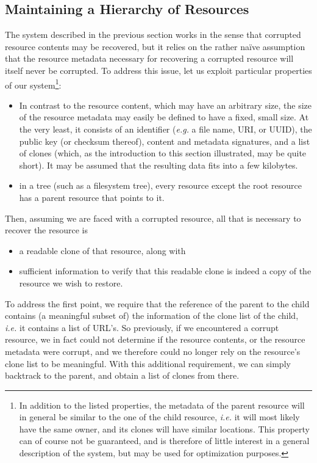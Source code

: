 \documentclass[11pt]{article}
\begin{document}
\begin{mainmatter}
\subsection{Maintaining a Hierarchy of Resources}
\label{hierarchy}
The system described in the previous section works in the sense that corrupted resource contents may be recovered, but it relies on the rather na\"ive assumption that the resource metadata necessary for recovering a corrupted resource will itself never be corrupted. To address this issue, let us exploit particular properties of our system\footnote{
In addition to the listed properties, the metadata of the parent resource will in general be similar to the one of the child resource, \emph{i.e.} it will most likely have the same owner, and its clones will have similar locations. This property can of course not be guaranteed, and is therefore of little interest in a general description of the system, but may be used for optimization purposes.
}:
\begin{itemize} 
\item In contrast to the resource content, which may have an arbitrary size, the size of the resource metadata may easily be defined to have a fixed, small size. At the very least, it consists of an identifier (\emph{e.g.} a file name, URI, or UUID), the public key (or checksum thereof), content and metadata signatures, and a list of clones (which, as the introduction to this section illustrated, may be quite short). It may be assumed that the resulting data fits into a few kilobytes.
\item in a tree (such as a filesystem tree), every resource except the root resource has a parent resource that points to it. 
\end{itemize}
Then, assuming we are faced with a corrupted resource, all that is necessary to recover the resource is 
\begin{itemize}
\item a readable clone of that resource, along with 
\item sufficient information to verify that this readable clone is indeed a copy of the resource we wish to restore.
\end{itemize}

To address the first point, we require that the reference of the parent to the child contains (a meaningful subset of) the information of the clone list of the child, \emph{i.e.} it contains a list of URL's. So previously, if we encountered a corrupt resource, we in fact could not determine if the resource contents, or the resource metadata were corrupt, and we therefore could no longer rely on the resource's clone list to be meaningful. With this additional requirement, we can simply backtrack to the parent, and obtain a list of clones from there. 


\end{mainmatter}
\end{document}
